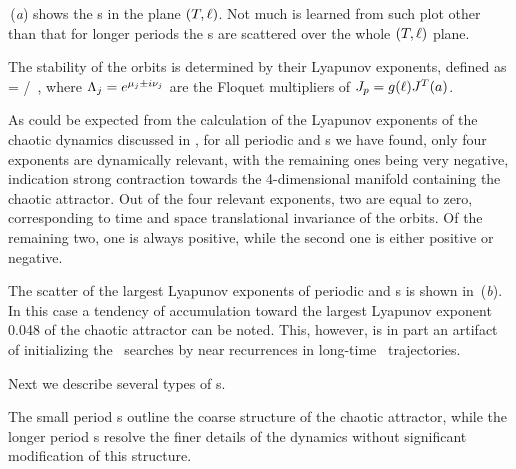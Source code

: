 \,(\textit{a}) shows the \rpo s in the plane
$(\period{},\shift)$.  Not much is learned from such plot other than
that for longer periods the \rpo s are scattered over the
whole $(\period{},\shift)$ plane.

The stability of the orbits is determined by their Lyapunov exponents,
defined as
\beq
{} = \eigRe[j]/\period{} \,,
where $\ExpaEig_j = e^{\eigRe[j] \pm i \eigIm[j]}$ are the
Floquet multipliers of $\jMps_p = g(\shift)J^T(a)$.


As could be expected from the calculation of the Lyapunov exponents
of the chaotic dynamics discussed in , for all
periodic and \rpo s we have found, only four 
exponents are dynamically relevant, with the remaining ones being
very negative, indication strong contraction towards the
4-dimensional manifold containing the chaotic attractor.  Out of the
four relevant exponents, two are equal to zero, corresponding to
time and space translational invariance of the orbits.  Of the
remaining two, one is always positive, while the second one is
either positive or negative.

The scatter of the largest Lyapunov exponents
of periodic and \rpo s is shown in \,(\textit{b}).
In this case a tendency of accumulation toward the largest
Lyapunov exponent 0.048 of the chaotic attractor
can be noted.  This, however, is in part an artifact of initializing
the \rpo\ searches by near recurrences in long-time \statesp\ 
trajectories.

Next we describe several types of \rpo s.


The small period \rpo s outline the coarse structure of the chaotic 
attractor, while the longer period \rpo s resolve the finer details 
of the dynamics without significant modification of this structure.

